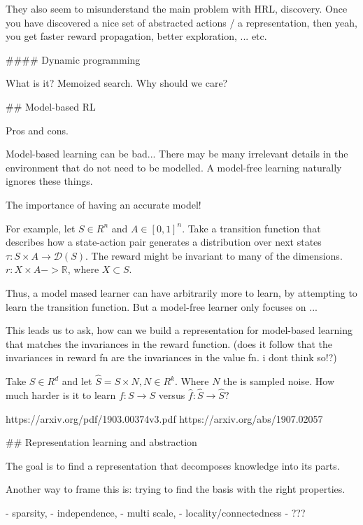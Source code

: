 They also seem to misunderstand the main problem with HRL, discovery. Once you have discovered a nice set of abstracted actions / a representation, then yeah, you get faster reward propagation, better exploration, ... etc.

#### Dynamic programming

What is it? Memoized search.
Why should we care?


## Model-based RL

Pros and cons.


Model-based learning can be bad...
There may be many irrelevant details in the environment that do not need to be modelled.
A model-free learning naturally ignores these things.

The importance of having an accurate model!

For example, let $S\in R^n$ and $A\in [0, 1]^n$. Take a transition function that describes how a state-action pair generates a distribution over next states $\tau: S \times A \to \mathcal D(S)$. The reward might be invariant to many of the dimensions. $r: X \times A -> \mathbb R$, where $X \subset S$.

Thus, a model mased learner can have arbitrarily more to learn, by attempting to learn the transition function. But a model-free learner only focuses on ...

This leads us to ask, how can we build a representation for model-based learning that matches the invariances in the reward function.
(does it follow that the invariances in reward fn are the invariances in the value fn. i dont think so!?)

Take $S \in R^d$ and let $\hat S = S \times N, N \in R^k$. Where $N$ the is sampled noise. How much harder is it to learn $f: S \to S$ versus $\hat f: \hat S \to \hat S$?

https://arxiv.org/pdf/1903.00374v3.pdf
https://arxiv.org/abs/1907.02057

## Representation learning and abstraction

The goal is to find a representation that decomposes knowledge into its parts.

Another way to frame this is: trying to find the basis with the right properties.

- sparsity,
- independence,
- multi scale,
- locality/connectedness
- ???
